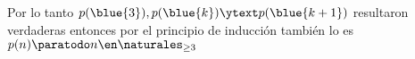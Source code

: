 Por lo tanto
$p(\blue{3}), p(\blue{k}) \ytext p(\blue{k+1})$ resultaron verdaderas entonces por el principio de inducción también
lo es $p(n) \paratodo n \en \naturales_{\geq3}$

\begin{aportes}
  \item {}
  \item {}
\end{aportes}
